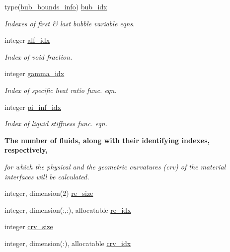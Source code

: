\begin{Indent}
\begin{DoxyCompactItemize}
type(\hyperlink{structm__derived__types_1_1bub__bounds__info}{bub\+\_\+bounds\+\_\+info}) \hyperlink{namespacem__global__parameters_a9a425d1bd91d1765043adf8410b98bf7}{bub\+\_\+idx}
\begin{DoxyCompactList}\small\item\em Indexes of first \& last bubble variable eqns. \end{DoxyCompactList}\item 
integer \hyperlink{namespacem__global__parameters_af451fa7762c859ef20552498fa6edb16}{alf\+\_\+idx}
\begin{DoxyCompactList}\small\item\em Index of void fraction. \end{DoxyCompactList}\item 
integer \hyperlink{namespacem__global__parameters_a4ecdedaf3db880f8d71dbefc816322f8}{gamma\+\_\+idx}
\begin{DoxyCompactList}\small\item\em Index of specific heat ratio func. eqn. \end{DoxyCompactList}\item 
integer \hyperlink{namespacem__global__parameters_a7db1a23566279bdbc7da68850c596c69}{pi\+\_\+inf\+\_\+idx}
\begin{DoxyCompactList}\small\item\em Index of liquid stiffness func. eqn. \end{DoxyCompactList}\end{DoxyCompactItemize}
\end{Indent}
\begin{Indent}\textbf{ The number of fluids, along with their identifying indexes, respectively,}\par
{\em for which the physical and the geometric curvatures (crv) of the material interfaces will be calculated. }\begin{DoxyCompactItemize}
\item 
integer, dimension(2) \hyperlink{namespacem__global__parameters_a0a67704d4c227871a155d6c26590f685}{re\+\_\+size}
\item 
integer, dimension(\+:,\+:), allocatable \hyperlink{namespacem__global__parameters_a33b4272ac0c75aff15851f9dfa6a9d14}{re\+\_\+idx}
\item 
integer \hyperlink{namespacem__global__parameters_a30e6fe4c4ff6a8cfefa1bf882dc2e90e}{crv\+\_\+size}
\item 
integer, dimension(\+:), allocatable \hyperlink{namespacem__global__parameters_a7b7945c133bf17eb1f25468a6d1a6925}{crv\+\_\+idx}
\end{DoxyCompactItemize}
\end{Indent}
